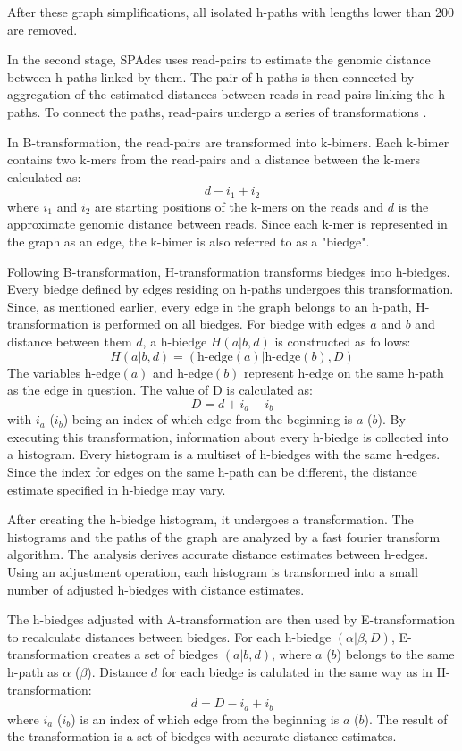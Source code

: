 After these graph simplifications, all isolated h-paths with lengths lower than 200 are removed.

In the second stage, SPAdes uses read-pairs to estimate the genomic distance between h-paths linked by them. The pair of h-paths is then connected by aggregation of the estimated distances between reads in read-pairs linking the h-paths. To connect the paths, read-pairs undergo a series of transformations \cite{bankevich2012spades}. 

In B-transformation, the read-pairs are transformed into k-bimers. Each k-bimer contains two k-mers from the read-pairs and a distance between the k-mers calculated as:
\[d - i_{1} + i_{2}\]
where $i_{1}$ and $i_{2}$ are starting positions of the k-mers on the reads and $d$ is the approximate genomic distance between reads. Since each k-mer is represented in the graph as an edge, the k-bimer is also referred to as a "biedge".

Following B-transformation, H-transformation transforms biedges into h-biedges. Every biedge defined by edges residing on h-paths undergoes this transformation. Since, as mentioned earlier, every edge in the graph belongs to an h-path, H-transformation is performed on all biedges. For biedge with edges $a$ and $b$ and distance between them $d$, a h-biedge $H(a|b,d)$ is constructed as follows:
\[ H(a|b,d) = (\text{h-edge}(a)|\text{h-edge}(b),D) \]
The variables h-edge$(a)$ and h-edge$(b)$ represent h-edge on the same h-path as the edge in question. The value of D is calculated as:
\[D = d + i_{a} - i_{b}\]
with $i_{a}$ ($i_{b}$) being an index of which edge from the beginning is $a$ ($b$). By executing this transformation, information about every h-biedge is collected into a histogram. Every histogram is a multiset of h-biedges with the same h-edges. Since the index for edges on the same h-path can be different, the distance estimate specified in h-biedge may vary.

After creating the h-biedge histogram, it undergoes a transformation. The histograms and the paths of the graph are analyzed by a fast fourier transform algorithm. The analysis derives accurate distance estimates between h-edges. Using an adjustment operation, each histogram is transformed into a small number of adjusted h-biedges with distance estimates.

The h-biedges adjusted with A-transformation are then used by E-transformation to recalculate distances between biedges. For each h-biedge $(\alpha|\beta,D)$, E-transformation creates a set of biedges $(a|b,d)$, where $a$ ($b$) belongs to the same h-path as $\alpha$ ($\beta$). Distance $d$ for each biedge is calulated in the same way as in H-transformation:
\[ d = D - i_{a} + i_{b} \]
where $i_{a}$ ($i_{b}$) is an index of which edge from the beginning is $a$ ($b$). The result of the transformation is a set of biedges with accurate distance estimates.

